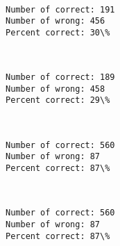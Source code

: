 \documentclass[11pt]{article}
\begin{document}
    \begin{center}
    \end{center}
    { \hspace*{\fill} \\}
    
    \begin{Verbatim}[commandchars=\\\{\}]
Number of correct: 191
Number of wrong: 456
Percent correct: 30\%

    \end{Verbatim}

    \begin{center}
    \end{center}
    { \hspace*{\fill} \\}
    
    \begin{Verbatim}[commandchars=\\\{\}]
Number of correct: 189
Number of wrong: 458
Percent correct: 29\%

    \end{Verbatim}

    \begin{center}
    \end{center}
    { \hspace*{\fill} \\}
    
    \begin{Verbatim}[commandchars=\\\{\}]
Number of correct: 560
Number of wrong: 87
Percent correct: 87\%

    \end{Verbatim}

    \begin{center}
    \end{center}
    { \hspace*{\fill} \\}
    
    \begin{Verbatim}[commandchars=\\\{\}]
Number of correct: 560
Number of wrong: 87
Percent correct: 87\%

    \end{Verbatim}
\end{document}
